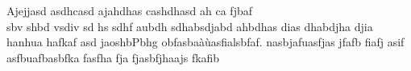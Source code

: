 \documentclass[a4paper,10pt]{article}
\begin{document}
Ajejjasd asdhcasd ajahdhas cashdhasd ah ca fjbaf \\sbv shbd vsdiv sd hs sdhf aubdh sdhabsdjabd ahbdhas dias dhabdjha djia hanhua hafkaf asd jaoshbPbhg obfasbaàùasfialsbfaf.
nasbjafuasfjas jfafb fiafj asif asfbuafbasbfka fasfha fja fjasbfjhaajs fkafib\lipsum\lipsum
\end{document}
